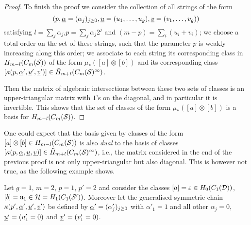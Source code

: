 \begin{proof}
To finish the proof we consider the collection of all strings of the form
\[
\left(p,\underline{\alpha}=(\alpha_j)_{j\geq 0},\underline{u}=(u_1,\dots,u_g),\underline{v}=(v_1,\dots,v_g)\right)
\]
satisfying $l=\sum_j\alpha_j$,$p=\sum_j \alpha_j2^j$ and $(m-p)=\sum_i(u_i+v_i)$;
we choose a total order on the set of these strings,
such that the parameter $p$ is weakly increasing along this order; we associate
to each string its corresponding class in $H_{m-l}(C_m(\mathcal{S}))$ of the form $\mu_*([a]\otimes [b])$ and its
corresponding class $[\kappa(p,\underline{\alpha}',\underline{u}',\underline{v}')]\in\tilde{H}_{m+l}(C_m(\mathcal{S})^{\infty})$.

Then the matrix of algebraic intersections between these two sets of
classes is an upper-triangular matrix
with $1$'s on the diagonal, and in particular
it is invertible. This shows that the set of classes of the form $\mu_*([a]\otimes [b])$
is a basis for $H_{m-l}(C_m(\mathcal{S}))$.

% 
% 
% 
% 
% 
% 
% 
\end{proof}

One could expect that the basis given by classes of the form $[a]\otimes [b]\in H_{m-l}(C_m(\mathcal{S}))$
is also \emph{dual} to the basis of classes $[\kappa(p,\underline{\alpha},\underline{u},\underline{v})]\in \tilde{H}_{m+l}(C_m(\mathcal{S})^{\infty})$, i.e., the
matrix considered in the end of the previous proof is not only upper-triangular but also
diagonal. This is however not true, as the following example shows.

Let $g=1$, $m=2$, $p=1$, $p'=2$ and consider the classes $[a]=\varepsilon\in H_0(C_1(\mathcal{D}))$,
$[b]=\mathfrak{u}_1\in \mathcal{H}=H_1(C_1(\mathcal{S}'))$. Moreover let the generalised symmetric chain
$\kappa(p',\underline{\alpha}',\underline{u}',\underline{v}')$ be defined by
$\underline{\alpha}'=(\alpha'_j)_{j\geq 0}$ with $\alpha'_1=1$ and all other $\alpha_j=0$, $\underline{u}'=(u'_1=0)$
and $\underline{v}'=(v'_1=0)$.

